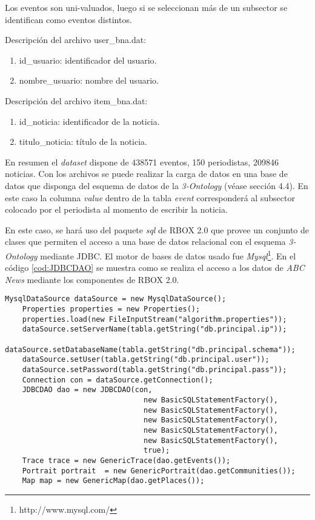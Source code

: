 Los eventos son uni-valuados, luego si se seleccionan más de un subsector se identifican como eventos distintos.

Descripción del archivo user\_bna.dat:
\begin{enumerate}
	\item id\_usuario: identificador del usuario.
	\item nombre\_usuario: nombre del usuario.
\end{enumerate}

Descripción del archivo item\_bna.dat:
\begin{enumerate}
	\item id\_noticia: identificador de la noticia.
	\item titulo\_noticia: título de la noticia.
\end{enumerate}

En resumen el \textit{dataset} dispone de 438571 eventos, 150 periodistas, 209846 noticias. Con los archivos se puede realizar la carga de datos en una base de datos que disponga del esquema de datos de la \textit{3-Ontology} (véase sección 4.4). En este caso la columna \textit{value} dentro de la tabla \textit{event} corresponderá al subsector colocado por el periodista al momento de escribir la noticia. 

En este caso, se hará uso del paquete \textit{sql} de RBOX 2.0 que provee un conjunto de clases que permiten el acceso a una base de datos relacional con el esquema \textit{3-Ontology} mediante JDBC. El motor de bases de datos usado fue \textit{Mysql}\footnote{http://www.mysql.com/}. En el código \ref{cod:JDBCDAO} se muestra como se realiza el acceso a los datos de \textit{ABC News} mediante los componentes de RBOX 2.0.

\begin{lstlisting}[float, caption = Ejemplo de uso mediante JDBCDAO, label = cod:JDBCDAO]
	MysqlDataSource dataSource = new MysqlDataSource();
	Properties properties = new Properties();
	properties.load(new FileInputStream("algorithm.properties"));
	dataSource.setServerName(tabla.getString("db.principal.ip"));
	dataSource.setDatabaseName(tabla.getString("db.principal.schema"));
	dataSource.setUser(tabla.getString("db.principal.user"));
	dataSource.setPassword(tabla.getString("db.principal.pass"));
	Connection con = dataSource.getConnection();
	JDBCDAO dao = new JDBCDAO(con, 
								new BasicSQLStatementFactory(), 
								new BasicSQLStatementFactory(),
								new BasicSQLStatementFactory(),
								new BasicSQLStatementFactory(),
								new BasicSQLStatementFactory(),
								true);
	Trace trace = new GenericTrace(dao.getEvents());
	Portrait portrait  = new GenericPortrait(dao.getCommunities());
	Map map = new GenericMap(dao.getPlaces());
\end{lstlisting}


